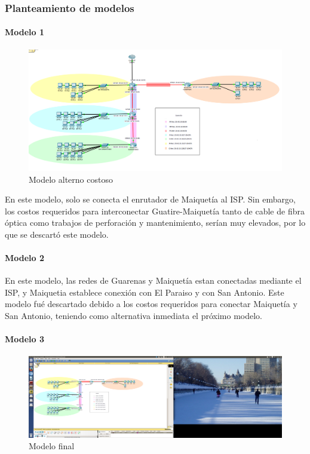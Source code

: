 \subsubsection{Planteamiento de modelos}\label{planteamiento-de-modelos}

\paragraph{Modelo 1}\label{modelo-1}

\begin{figure}[htbp]
\centering
\includegraphics{ModeloAlternoCostosos.png}
\caption{Modelo alterno costoso}
\end{figure}

En este modelo, solo se conecta el enrutador de Maiquetía al ISP. Sin
embargo, los costos requeridos para interconectar Guatire-Maiquetía
tanto de cable de fibra óptica como trabajos de perforación y
mantenimiento, serían muy elevados, por lo que se descartó este modelo.

\paragraph{Modelo 2}\label{modelo-2}

En este modelo, las redes de Guarenas y Maiquetía estan conectadas
mediante el ISP, y Maiquetia establece conexión con El Paraiso y con San
Antonio. Este modelo fué descartado debido a los costos requeridos para
conectar Maiquetía y San Antonio, teniendo como alternativa inmediata el
próximo modelo.

\paragraph{Modelo 3}\label{modelo-3}

\begin{figure}[htbp]
\centering
\includegraphics{ModeloFinal.png}
\caption{Modelo final}
\end{figure}

